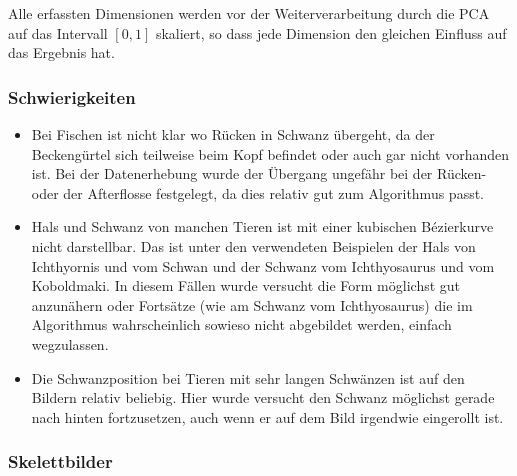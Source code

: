  Alle erfassten Dimensionen werden vor der Weiterverarbeitung durch die PCA auf das Intervall $[0, 1]$ skaliert, so dass jede Dimension den gleichen Einfluss auf das Ergebnis hat.
 
 \subsubsection{Schwierigkeiten}
 
 \begin{itemize}
  \item Bei Fischen ist nicht klar wo Rücken in Schwanz übergeht, da der Beckengürtel sich teilweise beim Kopf befindet oder auch gar nicht vorhanden ist. Bei der Datenerhebung wurde der Übergang ungefähr bei der Rücken- oder der Afterflosse festgelegt, da dies relativ gut zum Algorithmus passt.
  
  \item Hals und Schwanz von manchen Tieren ist mit einer kubischen Bézierkurve nicht darstellbar. Das ist unter den verwendeten Beispielen der Hals von Ichthyornis und vom Schwan und der Schwanz vom Ichthyosaurus und vom Koboldmaki. In diesem Fällen wurde versucht die Form möglichst gut anzunähern oder Fortsätze (wie am Schwanz vom Ichthyosaurus) die im Algorithmus wahrscheinlich sowieso nicht abgebildet werden, einfach wegzulassen.
  
  \item Die Schwanzposition bei Tieren mit sehr langen Schwänzen ist auf den Bildern relativ beliebig. Hier wurde versucht den Schwanz möglichst gerade nach hinten fortzusetzen, auch wenn er auf dem Bild irgendwie eingerollt ist.
  
 \end{itemize}


 
 \subsubsection{Skelettbilder}
 
